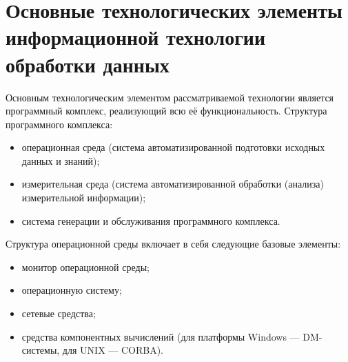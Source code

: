 \section{Основные технологических элементы информационной технологии
  обработки данных}

Основным технологическим элементом рассматриваемой технологии является
программный комплекс, реализующий всю её функциональность. Структура
программного комплекса:
\begin{itemize}
\item операционная среда (система автоматизированной подготовки
  исходных данных и знаний);
\item измерительная среда (система автоматизированной обработки
  (анализа) измерительной информации);
\item система генерации и обслуживания программного комплекса.
\end{itemize}

Структура операционной среды включает в себя следующие базовые
элементы:
\begin{itemize}
\item монитор операционной среды;
\item операционную систему;
\item сетевые средства;
\item средства компонентных вычислений (для платформы Windows ---
  DM-системы, для UNIX --- CORBA).
\end{itemize}

